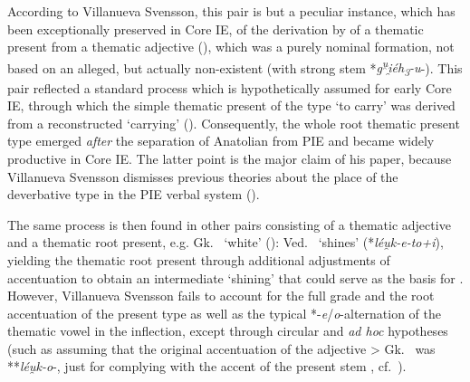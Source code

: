 \documentclass[output=paper,colorlinks,citecolor=brown]{langscibook}
\begin{document}
According to Villanueva Svensson, this pair is but a peculiar instance, which has been exceptionally preserved in Core IE, of the derivation by  of a thematic present from a thematic adjective (\citeyear[273--277]{VillanuevaSvensson2021}), which was a purely nominal formation, not based on an alleged, but actually non-existent  (with strong stem *\textit{g\textsuperscript{u̯}i̯éh\textsubscript{3}-u}-). This pair reflected a standard process which is hypothetically assumed for early Core IE, through which the simple thematic present of the type  ‘to carry’ was derived from a reconstructed   ‘carrying’ (\citealt[277--284]{VillanuevaSvensson2021}). Consequently, the whole root thematic present type emerged \textit{after} the separation of Anatolian from PIE and became widely productive in Core IE. The latter point is the major claim of his paper, because Villanueva Svensson dismisses previous theories about the place of the deverbative type  in the PIE verbal system (\citeyear[264--273]{VillanuevaSvensson2021}).

The same process is then found in other pairs consisting of a thematic adjective and a thematic root present, e.g. Gk.\   ‘white’ (): Ved.\   ‘shines’  (*\textit{léu̯k-e-to+i}), yielding the thematic root present  through additional adjustments of accentuation to obtain an intermediate  ‘shining’ that could serve as the basis for  . However, Villanueva Svensson fails to account for the full grade and the root accentuation of the  present type as well as the typical *-\textit{e}/\textit{o}-alternation of the thematic vowel in the inflection, except through circular and \textit{ad hoc} hypotheses (such as assuming that the original accentuation of the adjective  > Gk.\   was **\textit{léu̯k-o}\nobreakdash-, just for complying with the accent of the present stem , cf.\  \citealt[281--282, and fn.\ 43]{VillanuevaSvensson2021}).
\end{document}
